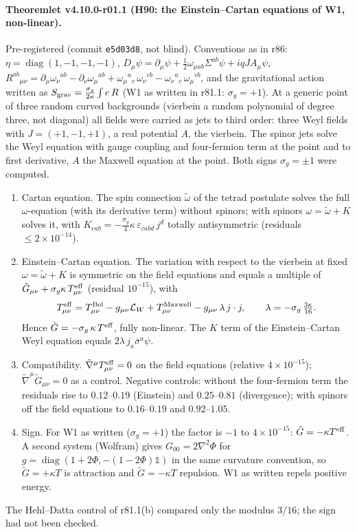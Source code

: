 \paragraph{Theoremlet v4.10.0-r01.1 (H90: the Einstein--Cartan equations of W1, non-linear).}
Pre-registered (commit \texttt{e5d03d8}, not blind).  Conventions as in r86: \(\eta=\operatorname{diag}(1,-1,-1,-1)\),
\(D_\mu\psi=\partial_\mu\psi+\tfrac12\omega_{\mu ab}\Sigma^{ab}\psi+iqJA_\mu\psi\),
\(R^{ab}{}_{\mu\nu}=\partial_\mu\omega_\nu{}^{ab}-\partial_\nu\omega_\mu{}^{ab}+\omega_\mu{}^a{}_c\,\omega_\nu{}^{cb}-\omega_\nu{}^a{}_c\,\omega_\mu{}^{cb}\), and the gravitational action
written as \(S_{\rm grav}=\tfrac{\sigma_g}{2\kappa}\int e\,R\) (W1 as written in r81.1: \(\sigma_g=+1\)).  At a generic point of three random curved
backgrounds (vierbein a random polynomial of degree three, not diagonal) all fields were carried as jets to third order: three Weyl
fields with \(J=(+1,-1,+1)\), a real potential \(A\), the vierbein.  The spinor jets solve the Weyl equation with gauge coupling and
four-fermion term at the point and to first derivative, \(A\) the Maxwell equation at the point.  Both signs \(\sigma_g=\pm1\) were computed.
\begin{enumerate}[leftmargin=2em]
\item[(a)] Cartan equation.  The spin connection \(\tilde\omega\) of the tetrad postulate solves the full \(\omega\)-equation (with its derivative
term) without spinors; with spinors \(\omega=\tilde\omega+K\) solves it, with \(K_{cab}=-\tfrac{\sigma_g}{4}\kappa\,\varepsilon_{cabd}\,j^d\) totally
antisymmetric (residuals \(\le2\times10^{-14}\)).
\item[(b)] Einstein--Cartan equation.  The variation with respect to the vierbein at fixed \(\omega=\tilde\omega+K\) is symmetric on the field
equations and equals a multiple of \(\tilde G_{\mu\nu}+\sigma_g\kappa\,T^{\rm eff}_{\mu\nu}\) (residual \(10^{-15}\)), with
\[
T^{\rm eff}_{\mu\nu}=T^{\rm Bel}_{\mu\nu}-g_{\mu\nu}\mathcal L_W+T^{\rm Maxwell}_{\mu\nu}-g_{\mu\nu}\,\lambda\,j\cdot j,
\qquad \lambda=-\sigma_g\,\tfrac{3\kappa}{16}.
\]
Hence \(\tilde G=-\sigma_g\,\kappa\,T^{\rm eff}\), fully non-linear.  The \(K\) term of the Einstein--Cartan Weyl equation equals
\(2\lambda\,j_a\bar\sigma^a\psi\).
\item[(c)] Compatibility.  \(\tilde\nabla^\mu T^{\rm eff}_{\mu\nu}=0\) on the field equations (relative \(4\times10^{-15}\)); \(\tilde\nabla^\mu\tilde G_{\mu\nu}=0\) as a
control.  Negative controls: without the four-fermion term the residuals rise to \(0.12\)--\(0.19\) (Einstein) and \(0.25\)--\(0.81\)
(divergence); with spinors off the field equations to \(0.16\)--\(0.19\) and \(0.92\)--\(1.05\).
\item[(d)] Sign.  For W1 as written (\(\sigma_g=+1\)) the factor is \(-1\) to \(4\times10^{-15}\): \(\tilde G=-\kappa T^{\rm eff}\).  A second system
(Wolfram) gives \(G_{00}=2\nabla^2\Phi\) for \(g=\operatorname{diag}(1+2\Phi,-(1-2\Phi)\mathbb 1)\) in the same curvature convention, so
\(\tilde G=+\kappa T\) is attraction and \(\tilde G=-\kappa T\) repulsion.  W1 as written repels positive energy.
\end{enumerate}
The Hehl--Datta control of r81.1(b) compared only the modulus \(3/16\); the sign had not been checked.


